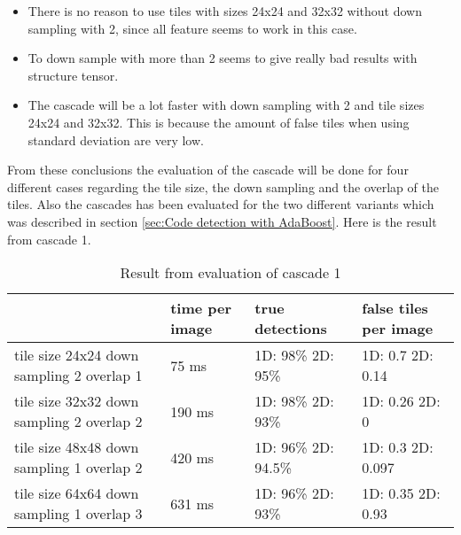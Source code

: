 \begin{itemize}
\item There is no reason to use tiles with sizes 24x24 and 32x32 without down sampling with 2, since all feature seems to work in this case.

\item To down sample with more than 2 seems to give really bad results with structure tensor.

\item The cascade will be a lot faster with down sampling with 2 and tile sizes 24x24 and 32x32. This is because the amount of false tiles when using standard deviation are very low.
\end{itemize}

From these conclusions the evaluation of the cascade will be done for four different cases regarding the tile size, the down sampling and the overlap of the tiles. Also the cascades has been evaluated for the two different variants which was described in section \ref{sec:Code detection with AdaBoost}. Here is the result from cascade 1.

\begin{table}[H]
\begin{center}
     \begin{tabular}{ | p{3cm} | l | p{3cm} | p{2cm}|}
     \hline
      	& time per image & true detections & false tiles \newline per image \\ \hline
   	 tile size 24x24 \newline down sampling 2 \newline overlap 1 
   	 & 75 ms & 1D: 98\% \newline 2D: 95\% & 1D: 0.7 \newline 2D: 0.14 				\\ \hline
     tile size 32x32 \newline down sampling 2 \newline overlap 2 
     & 190 ms & 1D: 98\% \newline 2D: 93\% & 1D: 0.26 \newline 2D: 0				\\ \hline
     tile size 48x48 \newline down sampling 1 \newline overlap 2 
     & 420 ms & 1D: 96\% \newline 2D: 94.5\% & 1D: 0.3 \newline 2D: 0.097
     \\ \hline
     tile size 64x64 \newline down sampling 1 \newline overlap 3 
     & 631 ms & 1D: 96\% \newline 2D: 93\% & 1D: 0.35 \newline 2D: 0.93		 \\ \hline
     \end{tabular}
\end{center}
\caption{Result from evaluation of cascade 1}
\label{table:ResultAdaBoost1}
\end{table}

